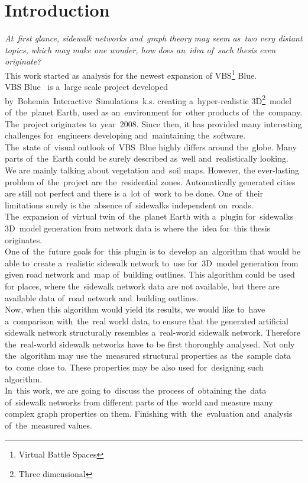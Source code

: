 \chapter*{Introduction}
\setcounter{page}{1}
\textit{At~first glance, sidewalk networks and~graph theory may seem as~two very distant topics, which may make one wonder, how does an~idea of~such thesis even originate?} \\
This work started as analysis for the newest expansion of VBS\footnote{Virtual Battle Spaces} Blue. \\
VBS Blue~\cite{vbs-blue} is a~large scale project developed by~Bohemia~Interactive~Simulations~k.s. creating a~hyper-realistic 3D\footnote{Three dimensional}~model of~the~planet Earth, used as an~environment for~other products of~the~company. The~project originates to~year~2008. Since then, it has provided many interesting challenges for~engineers developing and~maintaining the~software.\\
The~state of~visual outlook of~VBS~Blue highly differs around the~globe. Many parts of~the~Earth could be surely described as~well and~realistically looking. We are mainly talking about vegetation and~soil maps. However, the ever-lasting problem of~the~project are the~residential zones. Automatically generated cities are still not perfect and there is a~lot of~work to be done. One of~their limitations surely is the~absence of~sidewalks independent on~roads.
The~expansion of~virtual twin of~the~planet Earth with a~plugin for~sidewalks 3D~model generation from network data is where the~idea for~this thesis originates. \\
One of~the~future goals for~this plugin is to~develop an~algorithm that would be able to~create a~realistic sidewalk network to~use for~3D~model generation from given road network and~map of~building outlines. This algorithm could be used for places, where the~sidewalk network data are not available, but there are available data of~road network and~building outlines. \\
Now, when this algorithm would yield its results, we would like to~have a~comparison with~the~real world data, to ensure that the generated artificial sidewalk network structurally resembles a~real-world sidewalk network. Therefore the~real-world sidewalk networks have to be first thoroughly analysed. Not only the~algorithm may use the~measured structural properties as~the~sample data to~come close to. These properties may be also used for~designing such algorithm.\\
In~this work, we are going to~discuss the~process of~obtaining the~data of~sidewalk networks from different parts of the~world and measure many complex graph properties on them. Finishing with~the~evaluation and~analysis of~the~measured values.

